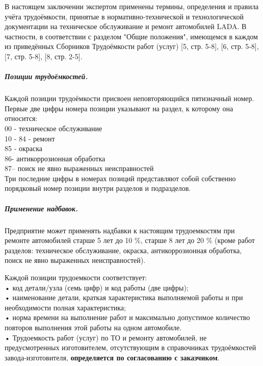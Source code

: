 В настоящем заключении экспертом применены термины,  определения и правила учёта трудоёмкости, принятые в  нормативно-технической и технологической документации на техническое обслуживание и ремонт автомобилей LADA. В частности, в соответствии с разделом 
"Общие положения", имеющемся в каждом из приведённых Сборников Трудоёмкости работ (услуг) [5, стр. 5-8], [6, стр. 5-8], [7, стр. 5-8], [8, стр. 2-5].

\subparagraph{Позиции трудоёмкостей.} Каждой позиции трудоёмкости присвоен неповторяющийся пятизначный номер. Первые две цифры
номера позиции указывают на раздел, к которому она относится:\\
00 - техническое обслуживание\\
10 - 84 - ремонт\\
85 - окраска\\
86- антикоррозионная обработка\\
87– поиск не явно выраженных неисправностей\\
Три последние цифры в номерах позиций представляют собой собственно порядковый номер позиции
внутри разделов и подразделов.

\subparagraph{Применение надбавок.}  Предприятие может применять надбавки к настоящим трудоемкостям при ремонте автомобилей старше
5 лет до 10 \%, старше 8 лет до 20 \% (кроме работ разделов: техническое обслуживание, окраска,
антикоррозионная обработка, поиск не явно выраженных неисправностей).

 Каждой позиции трудоемкости соответствует:\\
	• код детали/узла (семь цифр) и код работы (две цифры);\\
	• наименование детали, краткая характеристика выполняемой работы и при необходимости полная характеристика;\\
	• норма времени на выполнение работ и максимально допустимое количество повторов выполнения этой работы на одном автомобиле.\\%
    • Трудоемкость работ (услуг) по ТО и ремонту автомобилей, не предусмотренных изготовителем, отсутствующим в справочниках трудоёмкостей завода-изготовителя, \textbf{определяется по согласованию с заказчиком}.
       
    
    
